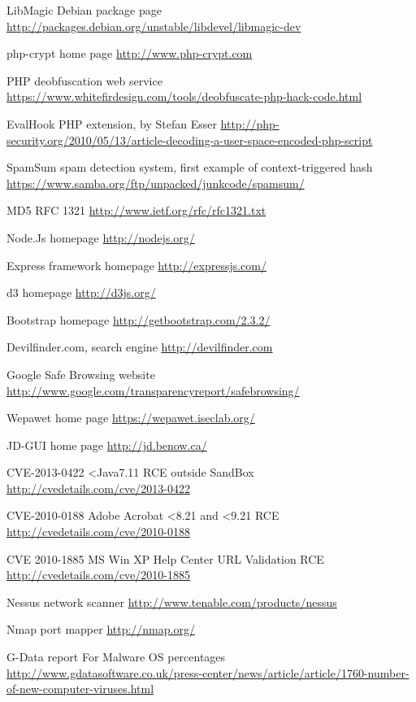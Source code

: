 \begin{thebibliography}{99}
LibMagic Debian package page
\url{http://packages.debian.org/unstable/libdevel/libmagic-dev}

php-crypt home page
\url{http://www.php-crypt.com}

PHP deobfuscation web service
\url{https://www.whitefirdesign.com/tools/deobfuscate-php-hack-code.html}

EvalHook PHP extension, by Stefan Esser
\url{http://php-security.org/2010/05/13/article-decoding-a-user-space-encoded-php-script}

SpamSum spam detection system, first example of context-triggered hash
\url{https://www.samba.org/ftp/unpacked/junkcode/spamsum/}

MD5 RFC 1321
\url{http://www.ietf.org/rfc/rfc1321.txt}

Node.Js homepage
\url{http://nodejs.org/}

Express framework homepage
\url{http://expressjs.com/}

d3 homepage
\url{http://d3js.org/}

Bootstrap homepage
\url{http://getbootstrap.com/2.3.2/}

Devilfinder.com, search engine
\url{http://devilfinder.com}

Google Safe Browsing website
\url{http://www.google.com/transparencyreport/safebrowsing/}

Wepawet home page
\url{https://wepawet.iseclab.org/}

JD-GUI home page
\url{http://jd.benow.ca/}

CVE-2013-0422 <Java7.11 RCE outside SandBox
\url{http://cvedetails.com/cve/2013-0422}

CVE-2010-0188 Adobe Acrobat <8.21 and <9.21 RCE
\url{http://cvedetails.com/cve/2010-0188}

CVE 2010-1885 MS Win XP Help Center URL Validation RCE
\url{http://cvedetails.com/cve/2010-1885}

Nessus network scanner
\url{http://www.tenable.com/products/nessus}

Nmap port mapper
\url{http://nmap.org/}

G-Data report For Malware OS percentages
\url{http://www.gdatasoftware.co.uk/press-center/news/article/article/1760-number-of-new-computer-viruses.html}


\end{thebibliography}

